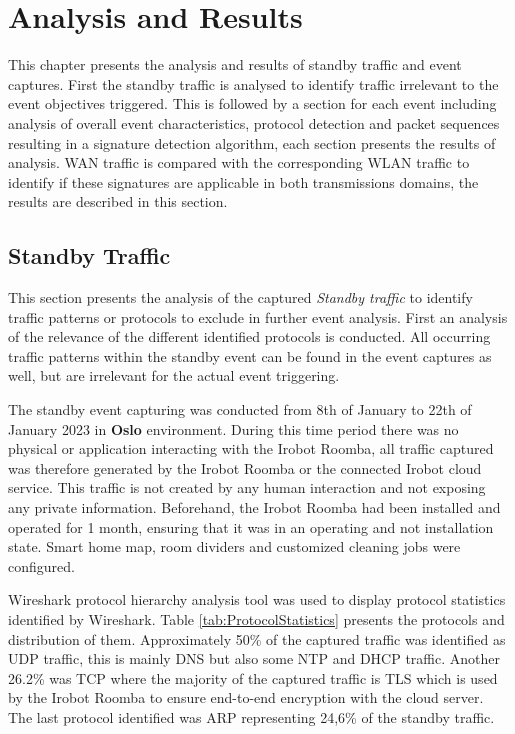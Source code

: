 \chapter{Analysis and Results}
\label{cap:AnalysisandResults}

This chapter presents the analysis and results of standby traffic and event captures. First the standby traffic is analysed to identify traffic irrelevant to the event objectives triggered. This is followed by a section for each event including analysis of overall event characteristics, protocol detection and packet sequences resulting in a signature detection algorithm, each section presents the results of analysis. WAN traffic is compared with the corresponding WLAN traffic to identify if these signatures are applicable in both transmissions domains, the results are described in this section. 

\section{Standby Traffic}
This section presents the analysis of the captured \textit{Standby traffic} to identify traffic patterns or protocols to exclude in further event analysis. First an analysis of the relevance of the different identified protocols is conducted. All occurring traffic patterns within the standby event can be found in the event captures as well, but are irrelevant for the actual event triggering.

The standby event capturing was conducted from 8th of January to 22th of January 2023 in \textbf{Oslo} environment. During this time period there was no physical or application interacting with the Irobot Roomba, all traffic captured was therefore generated by the Irobot Roomba or the connected Irobot cloud service. This traffic is not created by any human interaction and not exposing any private information. Beforehand, the Irobot Roomba had been installed and operated for 1 month, ensuring that it was in an operating and not installation state. Smart home map, room dividers and customized cleaning jobs were configured. 

Wireshark protocol hierarchy analysis tool was used to display protocol statistics identified by Wireshark. Table \ref{tab:ProtocolStatistics} presents the protocols and distribution of them. Approximately 50\% of the captured traffic was identified as UDP traffic, this is mainly DNS but also some NTP and DHCP traffic. Another 26.2\% was TCP where the majority of the captured traffic is TLS which is used by the Irobot Roomba to ensure end-to-end encryption with the cloud server. The last protocol identified was ARP representing 24,6\% of the standby traffic. 


